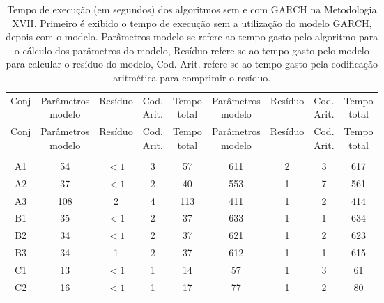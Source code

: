 \begin{center}
\begin{longtable}{ccccc|cccc}
\toprule
\rowcolor{white}
\caption[Metodologia XVII: tempo de execução]{Tempo de execução (em segundos)
dos algoritmos sem e com GARCH na Metodologia XVII. Primeiro é exibido o tempo de
execução sem a utilização do modelo GARCH, depois com o modelo. Parâmetros
modelo se refere ao tempo gasto pelo algoritmo para o cálculo dos parâmetros do
modelo, Resíduo refere-se ao tempo gasto pelo modelo para calcular o resíduo do
modelo, Cod. Arit. refere-se ao tempo gasto pela codificação aritmética para
comprimir o resíduo.} \label{tab:EvolucaoEntropiaMet17}\\
\midrule
Conj & \specialcell{Parâmetros\\modelo} &
Resíduo & \specialcell{Cod.\\Arit.} & \specialcell{Tempo\\total} &
\specialcell{Parâmetros\\modelo} &
Resíduo & \specialcell{Cod.\\Arit.} & \specialcell{Tempo\\total} \\
\midrule
\endfirsthead 
\midrule
\rowcolor{white}
Conj & \specialcell{Parâmetros\\modelo} &
Resíduo & \specialcell{Cod.\\Arit.} & \specialcell{Tempo\\total} &
\specialcell{Parâmetros\\modelo} &
Resíduo & \specialcell{Cod.\\Arit.} & \specialcell{Tempo\\total} \\
\toprule
\endhead
\midrule \\ %
\endfoot
\bottomrule 
\endlastfoot
A1&54&$<1$&3&57&611&2&3&617\\
A2&37&$<1$&2&40&553&1&7&561\\
A3&108&2&4&113&411&1&2&414\\
B1&35&$<1$&2&37&633&1&1&634\\
B2&34&$<1$&2&37&621&1&2&623\\
B3&34&1&2&37&612&1&1&615\\
C1&13&$<1$&1&14&57&1&3&61\\
C2&16&$<1$&1&17&77&1&2&80\\

\end{longtable}
\end{center}
